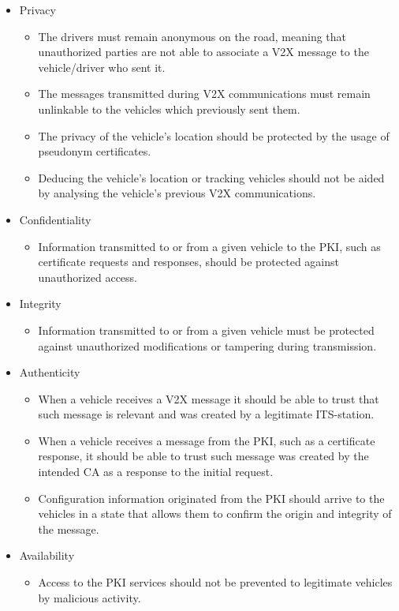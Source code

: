 \begin{itemize}
	\item Privacy
	\begin{itemize}
		\item The drivers must remain anonymous on the road, meaning that unauthorized parties are not able to associate a V2X message to the vehicle/driver who sent it.
		
		\item The messages transmitted during V2X communications must remain unlinkable to the vehicles which previously sent them.
		
		\item The privacy of the vehicle's location should be protected by the usage of pseudonym certificates.
		
		\item Deducing the vehicle's location or tracking vehicles should not be aided by analysing the vehicle's previous V2X communications.
		
		
	\end{itemize}
	
	\item Confidentiality
	\begin{itemize}
		\item Information transmitted to or from a given vehicle to the PKI, such as certificate requests and responses, should be protected against unauthorized access.
		
	\end{itemize}
	
	\item Integrity
	\begin{itemize}
		\item Information transmitted to or from a given vehicle must be protected against unauthorized modifications or tampering during transmission. 
	\end{itemize}
	
	\item Authenticity
	\begin{itemize}
		\item When a vehicle receives a V2X message it should be able to trust that such message is relevant and was created by a legitimate ITS-station. 
		
		\item When a vehicle receives a message from the PKI, such as a certificate response, it should be able to trust such message was created by the intended CA as a response to the initial request.
		
		\item Configuration information originated from the PKI should arrive to the vehicles in a state that allows them to confirm the origin and integrity of the message.
		
	\end{itemize}
	\item Availability
	\begin{itemize}
		\item Access to the PKI services should not be prevented to legitimate vehicles by malicious activity. 
	\end{itemize}
\end{itemize}


